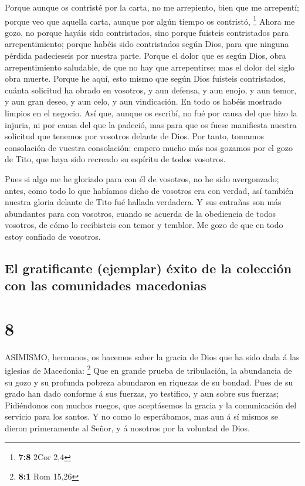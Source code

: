  Porque aunque os contristé por la carta, no me arrepiento,
bien que me arrepentí; porque veo que aquella carta, aunque por algún
tiempo os contristó, \footnote{\textbf{7:8} 2Cor 2,4}  Ahora
me gozo, no porque hayáis sido contristados, sino porque fuisteis
contristados para arrepentimiento; porque habéis sido contristados según
Dios, para que ninguna pérdida padecieseis por nuestra parte.
 Porque el dolor que es según Dios, obra arrepentimiento
saludable, de que no hay que arrepentirse; mas el dolor del siglo obra
muerte.  Porque he aquí, esto mismo que según Dios fuisteis
contristados, cuánta solicitud ha obrado en vosotros, y aun defensa, y
aun enojo, y aun temor, y aun gran deseo, y aun celo, y aun vindicación.
En todo os habéis mostrado limpios en el negocio.  Así que,
aunque os escribí, no fué por causa del que hizo la injuria, ni por
causa del que la padeció, mas para que os fuese manifiesta nuestra
solicitud que tenemos por vosotros delante de Dios.  Por
tanto, tomamos consolación de vuestra consolación: empero mucho más nos
gozamos por el gozo de Tito, que haya sido recreado su espíritu de todos
vosotros.

 Pues si algo me he gloriado para con él de vosotros, no he
sido avergonzado; antes, como todo lo que habíamos dicho de vosotros era
con verdad, así también nuestra gloria delante de Tito fué hallada
verdadera.  Y sus entrañas son más abundantes para con
vosotros, cuando se acuerda de la obediencia de todos vosotros, de cómo
lo recibisteis con temor y temblor.  Me gozo de que en todo
estoy confiado de vosotros.

\hypertarget{el-gratificante-ejemplar-uxe9xito-de-la-colecciuxf3n-con-las-comunidades-macedonias}{%
\subsection{El gratificante (ejemplar) éxito de la colección con las
comunidades
macedonias}\label{el-gratificante-ejemplar-uxe9xito-de-la-colecciuxf3n-con-las-comunidades-macedonias}}

\hypertarget{section-7}{%
\section{8}\label{section-7}}

 ASIMISMO, hermanos, os hacemos saber la gracia de Dios que
ha sido dada á las iglesias de Macedonia: \footnote{\textbf{8:1} Rom
  15,26}  Que en grande prueba de tribulación, la abundancia
de su gozo y su profunda pobreza abundaron en riquezas de su bondad.
 Pues de su grado han dado conforme á sus fuerzas, yo
testifico, y aun sobre sus fuerzas;  Pidiéndonos con muchos
ruegos, que aceptásemos la gracia y la comunicación del servicio para
los santos.  Y no como lo esperábamos, mas aun á sí mismos
se dieron primeramente al Señor, y á nosotros por la voluntad de Dios.

